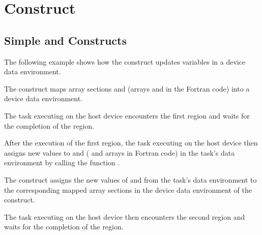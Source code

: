 \pagebreak
\section{  Construct}
\label{sec:target_update}

\subsection{Simple   and   Constructs}
\label{subsec:target_data_and_update}

The following example shows how the   construct updates 
variables in a device data environment.

The   construct maps array sections  and  
(arrays  and  in the Fortran code) into a device data environment.

The task executing on the host device encounters the first  region 
and waits for the completion of the region.

After the execution of the first  region, the task executing on 
the host device then assigns new values to  and  ( and  arrays 
in Fortran code) in the task's data environment by calling the function .

The   construct assigns the new values of  and 
 from the task's data environment to the corresponding mapped array sections 
in the device data environment of the   construct.

The task executing on the host device then encounters the second  
region and waits for the completion of the region.

